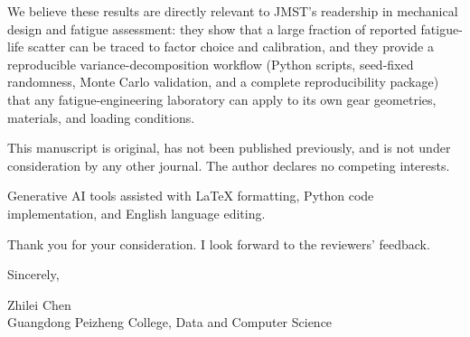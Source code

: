 \documentclass[12pt,a4paper]{article}
\begin{document}
We believe these results are directly relevant to JMST's readership in
mechanical design and fatigue assessment: they show that a large
fraction of reported fatigue-life scatter can be traced to factor
choice and calibration, and they provide a reproducible
variance-decomposition workflow (Python scripts, seed-fixed
randomness, Monte Carlo validation, and a complete reproducibility
package) that any fatigue-engineering laboratory can apply to its own
gear geometries, materials, and loading conditions.

This manuscript is original, has not been published previously, and is
not under consideration by any other journal. The author declares no
competing interests.

Generative AI tools assisted with LaTeX formatting, Python code
implementation, and English language editing.

Thank you for your consideration. I look forward to the reviewers'
feedback.

\vspace{4mm}

Sincerely,

\vspace{6mm}

Zhilei Chen\\
Guangdong Peizheng College, Data and Computer Science
\end{document}
